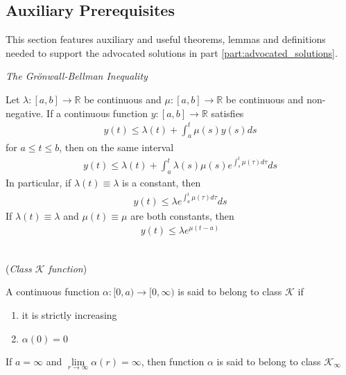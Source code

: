 \subsection{Auxiliary Prerequisites}

This section features auxiliary and useful theorems, lemmas and definitions
needed to support the advocated solutions in part
\ref{part:advocated_solutions}.

  \begin{lemma} \cite{khalil_nonlinear_systems} \textit{The Gr\"{o}nwall-Bellman Inequality}
    \label{lemma:bellman_inequality}

    Let $\lambda : [a,b] \to \mathbb{R}$ be continuous and
    $\mu : [a,b] \to \mathbb{R}$ be continuous and non-negative. If a
    continuous function $y : [a,b] \to \mathbb{R}$ satisfies
    \begin{align}
      y(t) \leq \lambda(t) + \int_a^t \mu(s) y(s) ds
    \end{align}
    for $a \leq t \leq b$, then on the same interval
    \begin{align}
      y(t) \leq \lambda(t) + \int_a^t \lambda(s) \mu(s) e^{\int_s^t \mu(\tau)d\tau} ds
    \end{align}
    In particular, if $\lambda(t) \equiv \lambda$ is a constant, then
    \begin{align}
      y(t) \leq \lambda e^{\int_a^t \mu(\tau)d\tau} ds
    \end{align}
    If $\lambda(t) \equiv \lambda$ and $\mu(t) \equiv \mu$ are both constants,
    then
    \begin{align}
      y(t) \leq \lambda e^{\mu (t - a)}
    \end{align}
    \\[2.5ex]
  \end{lemma}

\begin{definition}\cite{khalil_nonlinear_systems} (\textit{Class $\mathcal{K}$ function})
\label{def:k_class}

  A continuous function $\alpha : [0, a) \to [0, \infty)$
  is said to belong to class $\mathcal{K}$ if
  \begin{enumerate}
    \item it is strictly increasing
    \item $\alpha (0) = 0$
  \end{enumerate}
  If $a = \infty$ and $\lim\limits_{r \to \infty} \alpha(r) = \infty$, then function
  $\alpha$ is said to belong to class $\mathcal{K}_{\infty}$
\\[2.5ex]
\end{definition}


